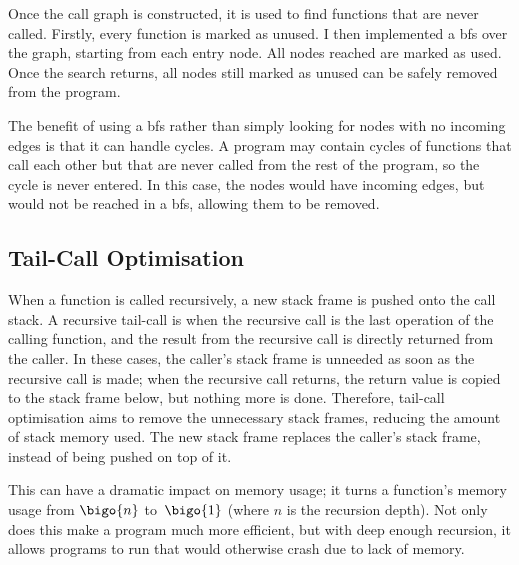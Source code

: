 \documentclass[00-main.tex]{subfiles}
\begin{document}


Once the call graph is constructed, it is used to find functions that are never called.
Firstly, every function is marked as unused.
I then implemented a \gls{bfs} over the graph, starting from each entry node.
All nodes reached are marked as used.
Once the search returns, all nodes still marked as unused can be safely removed from the program.

The benefit of using a \gls{bfs} rather than simply looking for nodes with no incoming edges is that it can handle cycles.
A program may contain cycles of functions that call each other but that are never called from the rest of the program, so the cycle is never entered.
In this case, the nodes would have incoming edges, but would not be reached in a \gls{bfs}, allowing them to be removed.


\subsection{Tail-Call Optimisation}\label{sec:impl:tail-call optimisation}

When a function is called recursively, a new stack frame is pushed onto the call stack.
A recursive tail-call is when the recursive call is the last operation of the calling function, and the result from the recursive call is directly returned from the caller.
In these cases, the caller's stack frame is unneeded as soon as the recursive call is made; when the recursive call returns, the return value is copied to the stack frame below, but nothing more is done.
Therefore, tail-call optimisation aims to remove the unnecessary stack frames, reducing the amount of stack memory used.
The new stack frame replaces the caller's stack frame, instead of being pushed on top of it.

This can have a dramatic impact on memory usage; it turns a function's memory usage from $\bigo{n}$ to~$\bigo{1}$ (where $n$ is the recursion depth).
Not only does this make a program much more efficient, but with deep enough recursion, it allows programs to run that would otherwise crash due to lack of memory.
\end{document}
